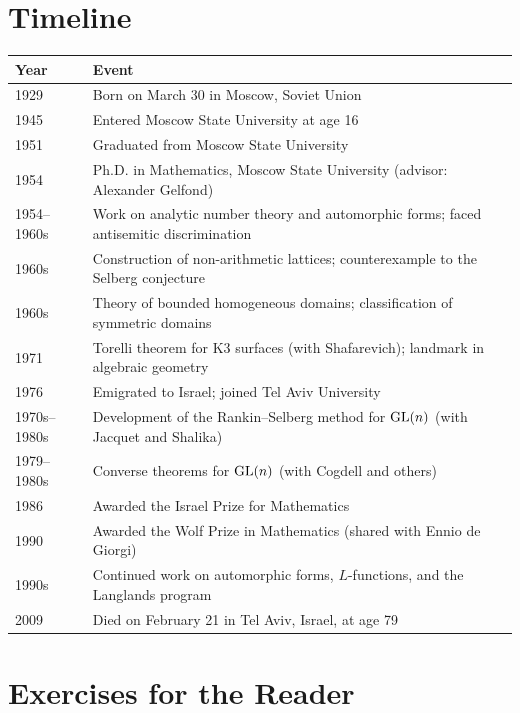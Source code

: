 \section*{Timeline}
\begin{tabularx}{\linewidth}{|p{1.5cm}|>{\raggedright\arraybackslash}X|}
\hline
\textbf{Year} & \textbf{Event} \\ \hline
1929 & Born on March 30 in Moscow, Soviet Union \\ \hline
1945 & Entered Moscow State University at age 16 \\ \hline
1951 & Graduated from Moscow State University \\ \hline
1954 & Ph.D. in Mathematics, Moscow State University (advisor: Alexander Gelfond) \\ \hline
1954--1960s & Work on analytic number theory and automorphic forms; faced antisemitic discrimination \\ \hline
1960s & Construction of non-arithmetic lattices; counterexample to the Selberg conjecture \\ \hline
1960s & Theory of bounded homogeneous domains; classification of symmetric domains \\ \hline
1971 & Torelli theorem for K3 surfaces (with Shafarevich); landmark in algebraic geometry \\ \hline
1976 & Emigrated to Israel; joined Tel Aviv University \\ \hline
1970s--1980s & Development of the Rankin--Selberg method for \(\operatorname{GL}(n)\) (with Jacquet and Shalika) \\ \hline
1979--1980s & Converse theorems for \(\operatorname{GL}(n)\) (with Cogdell and others) \\ \hline
1986 & Awarded the Israel Prize for Mathematics \\ \hline
1990 & Awarded the Wolf Prize in Mathematics (shared with Ennio de Giorgi) \\ \hline
1990s & Continued work on automorphic forms, \(L\)-functions, and the Langlands program \\ \hline
2009 & Died on February 21 in Tel Aviv, Israel, at age 79 \\ \hline
\end{tabularx}

\section*{Exercises for the Reader}

